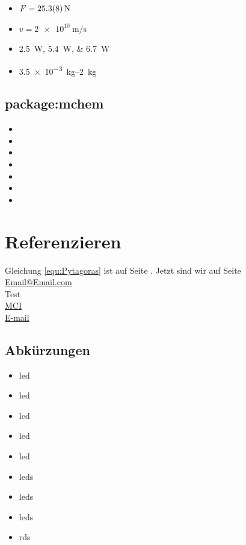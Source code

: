 \documentclass[a4paper, ngerman, oneside, 10pt]{article}
\begin{document}
\begin{itemize}
	\item $F=\SI{25,3 \pm 0,8}{\newton}$
	\item $v=\SI{2e10}{\m \per \s}$
	\item \SIlist{2,5;5,4;6,7}{\watt}
	\item \SIrange{3,5e-3}{2}{\kilo\g}
\end{itemize}

\subsection{package:mchem}
\begin{itemize}
	\item {}
	\item {} 
	\item {}
	\item {}
	\item {} 
	\item {}
	\item {} 
\end{itemize}


\section{Referenzieren}\label{sec:ref}
Gleichung \ref{equ:Pytagoras} ist auf Seite \pageref{equ:Pytagoras}. Jetzt sind wir auf Seite \pageref{sec:ref}\\
\href{mailto:mail@mail.mail}{Email@Email.com}\\
Test \cite{Kleiner.2022}\\
\href{https://www.mci.edu/de/}{MCI}\\
\href{mailto:jkdshf@dlsijkj.at}{E-mail}


\subsection{Abkürzungen}

\begin{itemize}
	\item \ac{led}		%
	\item \ac{led}		%
	\item \acf{led}		%
	\item \acl{led}		%
	\item \acs{led}		%
	\item \acp{led}		%
	\item \aclp{led}	%
	\item \acfp{led}	%
	\item \acp{rd}		%
\end{itemize}
\end{document}
